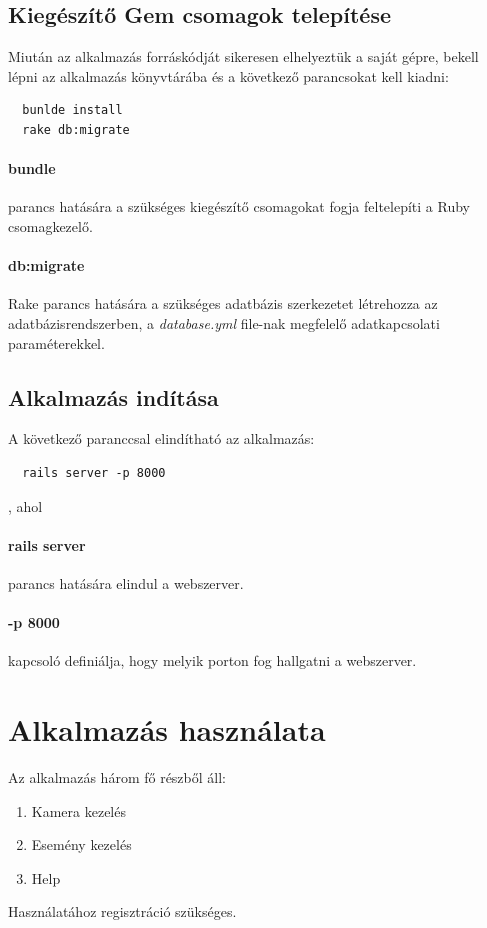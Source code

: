 \subsection{Kiegészítő Gem csomagok telepítése} %
\label{sub:kiegészítő_gem_csomagok_telepítése}
Miután az alkalmazás forráskódját sikeresen elhelyeztük a saját gépre, bekell lépni az alkalmazás könyvtárába és a következő parancsokat kell kiadni:
\begin{verbatim}
  bunlde install
  rake db:migrate
\end{verbatim}
\paragraph{bundle} parancs hatására a szükséges kiegészítő csomagokat fogja feltelepíti a Ruby csomagkezelő.

\paragraph{db:migrate} Rake parancs hatására a szükséges adatbázis szerkezetet létrehozza az adatbázisrendszerben, a \emph{database.yml} file-nak megfelelő adatkapcsolati paraméterekkel.

\subsection{Alkalmazás indítása} %
\label{sub:alkalmazás_indítása}
A következő paranccsal elindítható az alkalmazás:
\begin{verbatim}
  rails server -p 8000
\end{verbatim}, ahol
\paragraph{rails server} parancs hatására elindul a webszerver.
\paragraph{-p 8000} kapcsoló definiálja, hogy melyik porton fog hallgatni a webszerver.

\section{Alkalmazás használata} %
\label{sec:alkalmazás_használata}
Az alkalmazás három fő részből áll:
\begin{enumerate}
  \item Kamera kezelés
  \item Esemény kezelés
  \item Help
\end{enumerate}
Használatához regisztráció szükséges.

